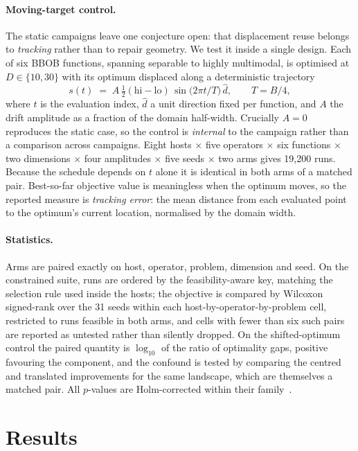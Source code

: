 \documentclass[11pt,a4paper]{article}
\begin{document}
\paragraph{Moving-target control.} The static campaigns leave one conjecture open: that
displacement reuse belongs to \emph{tracking} rather than to repair geometry. We test it
inside a single design. Each of six BBOB functions, spanning separable to highly
multimodal, is optimised at $D \in \{10,30\}$ with its optimum displaced along a
deterministic trajectory
\begin{equation}
  s(t) \;=\; A\,\tfrac{1}{2}(\text{hi}-\text{lo})\,\sin\!\big(2\pi t / T\big)\,\hat{d},
  \qquad T = B/4,
\end{equation}
where $t$ is the evaluation index, $\hat{d}$ a unit direction fixed per function, and $A$
the drift amplitude as a fraction of the domain half-width. Crucially $A = 0$ reproduces
the static case, so the control is \emph{internal} to the campaign rather than a
comparison across campaigns. Eight hosts $\times$ five operators $\times$ six functions
$\times$ two dimensions $\times$ four amplitudes $\times$ five seeds $\times$ two arms
gives 19{,}200 runs. Because the schedule depends on $t$ alone it is identical in both
arms of a matched pair. Best-so-far objective value is meaningless when the optimum
moves, so the reported measure is \emph{tracking error}: the mean distance from each
evaluated point to the optimum's current location, normalised by the domain width.

\paragraph{Statistics.} Arms are paired exactly on host, operator, problem, dimension and
seed. On the constrained suite, runs are ordered by the feasibility-aware key, matching
the selection rule used inside the hosts; the objective is compared by Wilcoxon
signed-rank over the 31 seeds within each host-by-operator-by-problem cell, restricted to
runs feasible in both arms, and cells with fewer than six such pairs are reported as
untested rather than silently dropped. On the shifted-optimum control the paired quantity
is $\log_{10}$ of the ratio of optimality gaps, positive favouring the component, and the
confound is tested by comparing the centred and translated improvements for the same
landscape, which are themselves a matched pair. All $p$-values are Holm-corrected within
their family~\citep{holm1979}.

\section{Results}
\end{document}
